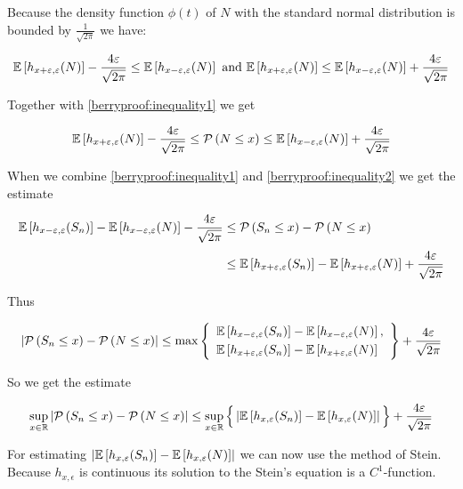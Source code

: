 Because the density function $\phi(t)$ of $N$ with the standard normal distribution is bounded by $\tfrac{1}{\sqrt{2\pi}}$ we have:

\begin{align}
  \mathbb E\left[{h_{x+\varepsilon,\varepsilon}(N)}\right]-\frac{4\varepsilon}{\sqrt{2\pi}} \le \mathbb E\left[{h_{x-\varepsilon,\varepsilon}(N)}\right] \text{ and } \mathbb E\left[{h_{x+\varepsilon,\varepsilon}(N)}\right] \le \mathbb E\left[{h_{x-\varepsilon,\varepsilon}(N)}\right] + \frac{4\varepsilon}{\sqrt{2\pi}}
\end{align}

\noindent Together with \eqref{berryproof:inequality1} we get

\begin{align} \label{berryproof:inequality2}
  \mathbb E\left[{h_{x+\varepsilon,\varepsilon}(N)}\right]-\frac{4\varepsilon}{\sqrt{2\pi}} \le \mathcal P\left({N\le x}\right) \le \mathbb E\left[{h_{x-\varepsilon,\varepsilon}(N)}\right] + \frac{4\varepsilon}{\sqrt{2\pi}}
\end{align}

\noindent When we combine \eqref{berryproof:inequality1} and \eqref{berryproof:inequality2} we get the estimate

\begin{align}
  \E{h_{x-\epsilon,\epsilon}(S_n)} - \E{h_{x-\epsilon,\epsilon}(N)} - \frac{4\epsilon}{\sqrt{2\pi}} & \le \P{S_n \le x} - \P{N \le x} \nl
  &\le \E{h_{x+\epsilon,\epsilon}(S_n)} - \E{h_{x+\epsilon,\epsilon}(N)} + \frac{4\epsilon}{\sqrt{2\pi}}
\end{align}

\noindent Thus

\begin{align}
  \abs{\P{S_n \le x}-\P{N \le x}} \le \max\left\{
    \begin{array}{l}
      \E{h_{x-\epsilon,\epsilon}(S_n)} - \E{h_{x-\epsilon,\epsilon}(N)}, \nl
      \E{h_{x+\epsilon,\epsilon}(S_n)} - \E{h_{x+\epsilon,\epsilon}(N)}
    \end{array}
  \right\} + \frac{4\epsilon}{\sqrt{2\pi}}
\end{align}

\noindent So we get the estimate

\begin{align} \label{berryproof:before_stein}
  \sup_{x\in\mathbb R} \left|{\mathcal P\left({S_n \le x}\right) - \mathcal P\left({N \le x}\right)}\right| \le \sup_{x\in\mathbb R} \Big\{ \left|{\mathbb E\left[{h_{x,\varepsilon}(S_n)}\right] - \mathbb E\left[{h_{x,\varepsilon}(N)}\right]}\right| \Big\} + \frac{4\varepsilon}{\sqrt{2\pi}}
\end{align}

For estimating $\left|{\mathbb E\left[{h_{x,\varepsilon}(S_n)}\right] - \mathbb E\left[{h_{x,\varepsilon}(N)}\right]}\right|$ we can now use the method of Stein. Because $h_{x,\epsilon}$ is continuous its solution to the Stein's equation is a $C^1$-function.

